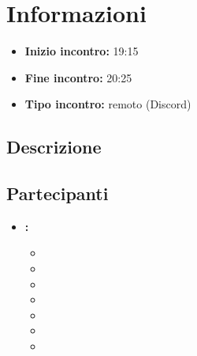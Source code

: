 \section{Informazioni}
\begin{itemize}
	\item \textbf{Inizio incontro:} 19:15
	\item \textbf{Fine incontro:} 20:25
	\item \textbf{Tipo incontro:} remoto (Discord)
\end{itemize}

\subsection{Descrizione}
\DocDescription

\subsection{Partecipanti}

\begin{itemize}
	\item \textbf{\GroupName:}
	\begin{itemize}
		\item \tommaso
		\item \marco
		\item \raul
		\item \sebastiano
		\item \mattia
		\item \martina
		\item \riccardo
	\end{itemize}
\end{itemize}

\clearpage
